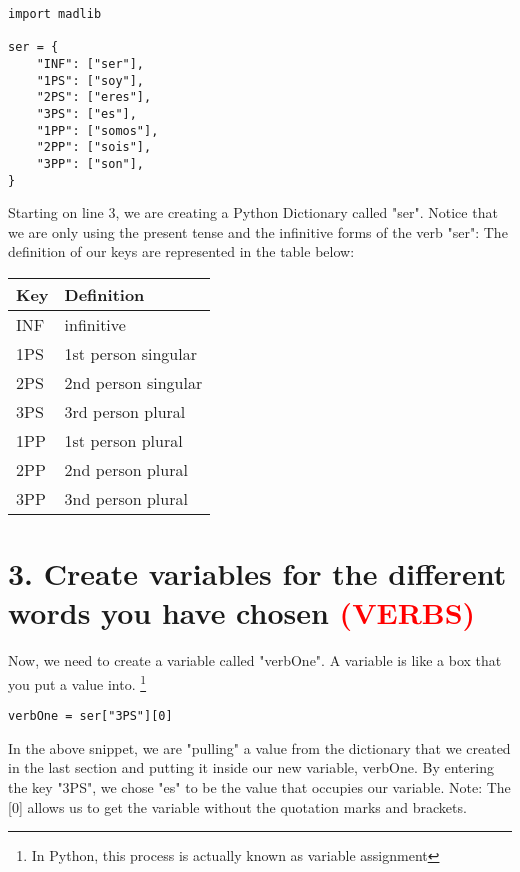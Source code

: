 \documentclass[a4paper,11pt]{article}
\theoremstyle{mytheor}
\begin{document}
\begin{lstlisting}[label={list:first},caption=Put this dictionary of "ser" below your import line]
import madlib

ser = {
    "INF": ["ser"],
    "1PS": ["soy"],
    "2PS": ["eres"],
    "3PS": ["es"], 
    "1PP": ["somos"],
    "2PP": ["sois"],
    "3PP": ["son"],
}
\end{lstlisting}
Starting on line 3, we are creating a Python Dictionary called "ser". 
Notice that we are only using the present tense and the infinitive forms of the verb "ser":  The definition of our keys are represented in the table below: 

\begin{center}
\begin{tabular}{ |l|l| }
  \hline
  \textbf{Key} & \textbf{Definition}\\ \hline
  INF & infinitive \\ \hline
  1PS & 1st person singular \\ \hline
  2PS & 2nd person singular \\ \hline
  3PS & 3rd person plural \\ \hline
  1PP & 1st person plural \\ \hline
  2PP & 2nd person plural \\ \hline
  3PP & 3nd person plural \\ \hline
\end{tabular}
\end{center}

\section*{3. Create variables for the different words you have chosen \textcolor{red}{(VERBS)}}

Now, we need to create a variable called "verbOne". A variable is like a box that you put a value into. \footnote{In Python, this process is actually known as variable assignment}

\begin{lstlisting}[label={list:second},caption=Add this to the bottom of your code]
verbOne = ser["3PS"][0]
\end{lstlisting}
In the above snippet, we are "pulling" a value from the dictionary that we created in the last section and putting it inside our new variable, verbOne. By entering the key "3PS", we chose "es" to be the value that occupies our variable.
\newline
\newline
Note: The [0] allows us to get the variable without the quotation marks and brackets.
\end{document}
